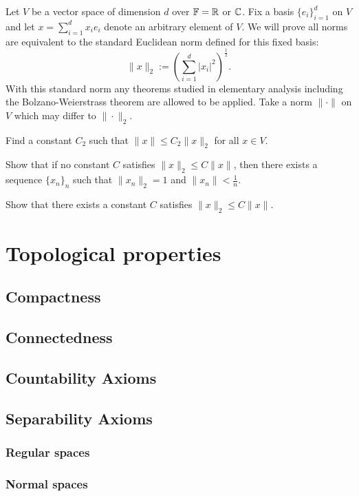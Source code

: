 \documentclass{../note}
\begin{document}
\begin{prb}
Let $V$ be a vector space of dimension $d$ over $\mathbb{F}=\mathbb{R}$ or $\mathbb{C}$.
Fix a basis $\{e_i\}_{i=1}^d$ on $V$ and let $x=\sum_{i=1}^dx_ie_i$ denote an arbitrary element of $V$.
We will prove all norms are equivalent to the standard Euclidean norm defined for this fixed basis:
\[\|x\|_2:=(\sum_{i=1}^d|x_i|^2)^{\frac12}.\]
With this standard norm any theorems studied in elementary analysis including the Bolzano-Weierstrass theorem are allowed to be applied.
Take a norm $\|\cdot\|$ on $V$ which may differ to $\|\cdot\|_2$.
\begin{parts}
\item Find a constant $C_2$ such that $\|x\|\le C_2\|x\|_2$ for all $x\in V$.
\item Show that if no constant $C$ satisfies $\|x\|_2\le C\|x\|$, then there exists a sequence $\{x_n\}_n$ such that $\|x_n\|_2=1$ and $\|x_n\|<\tfrac1n$.
\item Show that there exists a constant $C$ satisfies $\|x\|_2\le C\|x\|$.
\end{parts}
\end{prb}




\part{Topological properties}
\chapter{Compactness}
\chapter{Connectedness}
\chapter{Countability Axioms}
\chapter{Separability Axioms}
\section{Regular spaces}
\section{Normal spaces}
\end{document}
